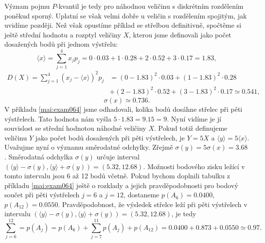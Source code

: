\begin{example}
  Význam pojmu \(P\)-kvantil je tedy pro náhodnou veličinu s diskrétním rozdělením poněkud sporný. 
  Uplatní se však velmi dobře u veličin s rozdělením spojitým, jak uvidíme později. Než však 
  opustíme příklad se střelbou definitivně, spočtěme si ještě střední hodnotu a rozptyl veličiny 
  \(X\), kterou jsme definovali jako počet dosažených bodů při jednom výstřelu:
  \begin{equation*}
    \langle x \rangle = \sum_{j=1}^{4}x_jp_j = 0\cdot\num{0.03} + 1\cdot\num{0.28} 
     + 2\cdot\num{0.52} + 3\cdot\num{0.17} = \num{1.83}, 
  \end{equation*}
  \begin{align*}
    D(X)  = \sum_{j=1}^{4}\left(x_j - \langle x \rangle \right)^2p_j 
         &= (0 - \num{1.83})^2\cdot\num{0.03} + (1 - \num{1.83})^2\cdot\num{0.28}           \\
         &+ (2 - \num{1.83})^2\cdot\num{0.52} + (3 - \num{1.83})^2\cdot\num{0.17} \simeq\num{0.541},
  \end{align*}
  \begin{equation*}
    \sigma(x) \simeq \num{0.736}.
  \end{equation*}
  V příkladu \ref{mai:exam064} jsme odhadovali, kolika bodů dosáhne střelec při pěti výstřelech. 
  Tato hodnota nám vyšla \(\num{5}\cdot\num{1.83} = \num{9.15} = 9\). Nyní vidíme je jí souvislost 
  se střední hodnotou náhodné veličiny \(X\). Pokud totiž definujeme veličinu \(Y\) jako počet bodů 
  dosažených při pěti výstřelech, je \(Y = 5X\) a \(\langle y \rangle = 5\langle x \rangle\). 
  Uvažujme nyní o významu směrodatné odchylky. Zřejmě \(\sigma(y) = 5\sigma(x) = \num{3.68}\). 
  Směrodatná odchylka \(\sigma(y)\) určuje interval \((\langle y \rangle - \sigma(y), \langle y 
  \rangle + \sigma(y)) = (\num{5.32}, \num{12.68})\). Možnosti bodového zisku ležící v tomto 
  intervalu jsou \num{6} až \num{12} bodů včetně. Pokud bychom doplnili tabulku z příkladu 
  \ref{mai:exam064} ještě o rozklady a jejich pravděpodobnosti pro bodový součet při pěti
  výstřelech \(j = \num{6}\) a \(j = \num{12}\), dostaneme \(p(A_6) = \num{0.0400}\), \(p(A_{12}) = 
  \num{0.0550}\). Pravděpodobnost, že výsledek střelce leží při pěti výstřelech v intervalu 
  \((\langle y \rangle - \sigma(y), \langle y \rangle + \sigma(y)) = (\num{5.32}, \num{12.68})\), 
  je tedy
  \begin{equation*}
    \sum_{j=6}^{12} = p(A_j) = p(A_6) + \sum_{j=7}^{11}p(A_j) + p(A_{12}) 
                    = \num{0.0400} + \num{0.873} + \num{0.0550} \simeq \num{0.97}.
  \end{equation*}

\end{example}
